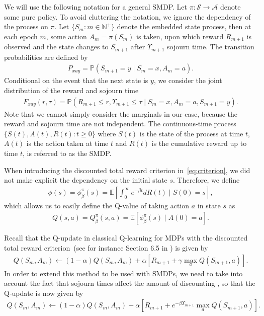 \documentclass{article}
\theoremstyle{definition}
\theoremstyle{plain}
\begin{document}
We will use the following notation for a general SMDP. Let
$\pi : \mathcal{S} \rightarrow \mathcal{A}$ denote some pure policy. To avoid
cluttering the notation, we ignore the dependency of the process on $\pi$. Let
$\{ S_{m} : m \in \mathbb{N}^{+} \}$ denote the embedded state process, then at
each epoch $m$, some action $A_{m} = \pi(S_{m})$ is taken, upon which reward
$R_{m+1}$ is observed and the state changes to $S_{m+1}$ after $\Upsilon_{m+1}$
sojourn time. The transition probabilities are defined by
\begin{align}
  P_{xay} = \mathbb{P}(S_{m+1} = y \; | \; S_{m} = x, A_{m} = a) .
\end{align}
Conditional on the event that the next state is $y$, we consider the joint
distribution of the reward and sojourn time
\begin{align}
  F_{xay}(r, \tau) = \mathbb{P}(R_{m+1} \leq r, \Upsilon_{m+1} \leq \tau \; | \; S_{m} = x, A_{m} = a, S_{m+1} = y ) .
\end{align}
Note that we cannot simply consider the marginals in our case, because the
reward and sojourn time are not independent. The continuous-time process
$\{ S(t), A(t), R(t) : t \geq 0 \}$ where $S(t)$ is the state of the process at
time $t$, $A(t)$ is the action taken at time $t$ and $R(t)$ is the cumulative
reward up to time $t$, is referred to as the SMDP.

When introducing the discounted total reward criterion in~\eqref{eq:criterion},
we did not make explicit the dependency on the initial state $s$. Therefore, we
define
\begin{align}
  \phi(s) = \phi_{\beta}^{\pi}(s) = \mathbb{E} \left[ \int_{0}^{\infty} e^{- \beta t} dR(t) \; \big| \; S(0) = s \right] ,
\end{align}
which allows us to easily define the Q-value of taking action $a$ in state $s$ as
\begin{align}
  Q(s, a) = Q_{\beta}^{\pi}(s, a) = \mathbb{E} \left[ \phi_{\beta}^{\pi}(s) \; \big| \;  A(0) = a \right] .
\end{align}

Recall that the Q-update in classical Q-learning for MDPs with the discounted
total reward criterion~(see for instance Section 6.5 in
\cite{suttonReinforcementLearningIntroduction2018}) is given by
\begin{align}
  Q(S_{m}, A_{m}) \leftarrow (1 - \alpha) Q(S_{m}, A_{m}) + \alpha[ R_{m+1} + \gamma \max_{a} Q(S_{m+1}, a) ] .
\end{align}
%
In order to extend this method to be used with SMDPs, we need to take into
account the fact that sojourn times affect the amount of discounting
\citep{gosaviSimulationBasedOptimizationParametric2015}, so that the Q-update is
now given by
\begin{align}
  Q(S_{m}, A_{m}) \leftarrow (1 - \alpha) Q(S_{m}, A_{m}) + \alpha[ R_{m+1} + e^{- \beta \Upsilon_{m+1}} \max_{a} Q(S_{m+1}, a) ] .
\end{align}
\end{document}

